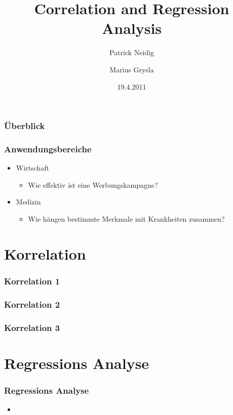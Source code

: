 \documentclass{beamer}
\begin{document}
\title{Correlation and Regression Analysis}
\author{Patrick Neidig \and Marius Grysla}
\date{19.4.2011}
\frame{\titlepage}

\begin{frame}
 \frametitle{\"Uberblick}
 \tableofcontents
\end{frame}

\begin{frame}
 \frametitle{Anwendungsbereiche}

 \begin{itemize}
  \item Wirtschaft
  \begin{itemize}
   \item Wie effektiv ist eine Werbungskampagne?
  \end{itemize}

  \item Medizin
  \begin{itemize}
   \item Wie h\"angen bestimmte Merkmale mit Krankheiten zusammen?
  \end{itemize}

 \end{itemize}

\end{frame}


\section{Korrelation}

\begin{frame}
 \frametitle{Korrelation 1}
\end{frame}

\begin{frame}
 \frametitle{Korrelation 2}
\end{frame}

\begin{frame}
 \frametitle{Korrelation 3}
\end{frame}

\section{Regressions Analyse}

\begin{frame}
 \frametitle{Regressions Analyse}
 

 \begin{itemize}
  \item 
 \end{itemize}

\end{frame}
\end{document}

